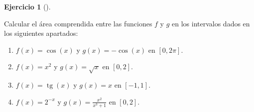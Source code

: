\documentclass[
  a4paper,
]{scrreport}
\theoremstyle{definition}
\newtheorem{exercise}{Ejercicio}[chapter]
\theoremstyle{remark}
\begin{document}
\begin{exercise}[]\protect\hypertarget{exr-area-entre-funciones}{}\label{exr-area-entre-funciones}

Calcular el área comprendida entre las funciones \(f\) y \(g\) en los
intervalos dados en los siguientes apartados:

\begin{enumerate}
\def\labelenumi{\alph{enumi}.}
\item
  \(f(x)=\cos(x)\) y \(g(x)=-\cos(x)\) en \([0,2\pi]\).
\item
  \(f(x)=x^2\) y \(g(x)=\sqrt{x}\) en \([0,2]\).
\item
  \(f(x)=\operatorname{tg}(x)\) y \(g(x)=x\) en \([-1,1]\).
\item
  \(f(x)= 2^{-x}\) y \(g(x)=\frac{x^2}{x^3+1}\) en \([0,2]\).
\end{enumerate}

\end{exercise}
\end{document}
